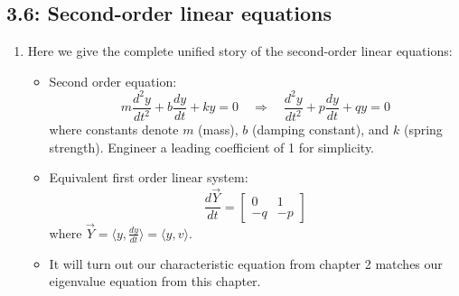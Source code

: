 \documentclass{article}
\begin{document}
\subsection{3.6: Second-order linear equations}

\begin{enumerate}

\item Here we give the complete unified story of the second-order linear equations:
\begin{itemize}
\item Second order equation:
\[
m \frac{d^2 y}{dt^2} + b \frac{dy}{dt} + ky = 0 \quad \Rightarrow \quad 
\frac{d^2 y}{dt^2} + p \frac{dy}{dt} + qy = 0 
\]
where constants denote $m$ (mass), $b$ (damping constant), and $k$ (spring strength). Engineer a leading coefficient of 1 for simplicity.
\item Equivalent first order linear system:
\[
\frac{d \vec{Y}}{dt} = 
\begin{bmatrix}
0 & 1 \\
-q & -p
\end{bmatrix}
\] 
where $\vec{Y} = \langle y,\frac{dy}{dt} \rangle  = \langle y,v \rangle$.
\item It will turn out our characteristic equation from chapter 2 matches our eigenvalue equation from this chapter.
\end{itemize}



\end{enumerate}
\end{document}
